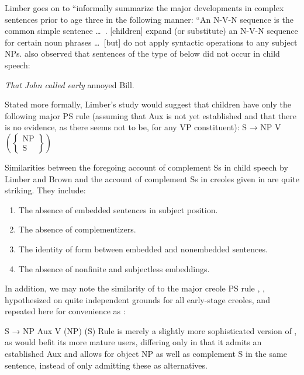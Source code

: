 Limber goes on to ``informally summarize the major developments in complex sentences prior to age three in the following manner: ``An N-V-N sequence is the common simple sentence \ldots~. [children] expand (or substitute) an N-V-N sequence for certain noun phrases \ldots~[but] do not apply syntactic operations to any subject NPs. \citet[21]{Brown1973} also observed that sentences of the type of  below did not occur in child speech:

\ea\label{ex:3:38}
 \textit{That John called early} annoyed Bill.
\z

\noindent Stated more formally, Limber's study would suggest that children have only the following major PS rule (assuming that Aux is not yet 
established and that there is no evidence, as there seems not to be, for any VP constituent):
\ea\label{ex:3:39}
S → NP V $\left(\left\{\begin{array}{c}\text{NP}\\\text{S}\end{array}\right\}\right)$
\z

Similarities between the foregoing account of complement Ss in child speech by Limber and Brown and the account of complement Ss in creoles given in  are quite striking. They include:

\begin{enumerate}
\item The absence of embedded sentences in subject position.
\item The absence of complementizers.
\item The identity of form between embedded and nonembedded sentences.
\item The absence of nonfinite and subjectless embeddings.
\end{enumerate}
 
In addition, we may note the similarity of  to the major creole PS rule , , hypothesized on quite independent grounds for all early-stage creoles, and repeated here for convenience as :

\ea\label{ex:3:40}
 S → NP Aux V (NP) (S) 
\z
Rule  is merely a slightly more sophisticated version of , as would befit its more mature users, differing only in that it admits an established Aux and allows for object NP as well as complement S in the same sentence, instead of only admitting these as alternatives.


